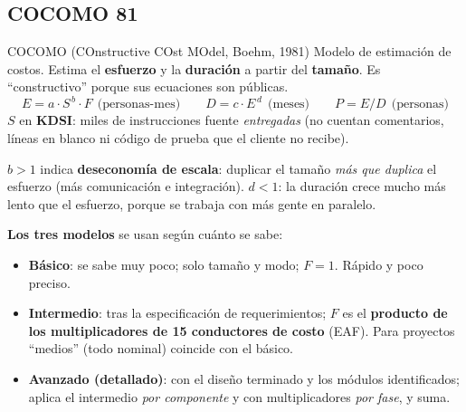 \documentclass[11pt,a4paper]{article}
\begin{document}
\subsection{COCOMO 81}
\label{sec:cocomo}
\begin{defbox}{COCOMO (COnstructive COst MOdel, Boehm, 1981)}
Modelo de estimación de costos. Estima el \textbf{esfuerzo} y la
\textbf{duración} a partir del \textbf{tamaño}. Es ``constructivo'' porque sus ecuaciones son públicas.
\[ E = a \cdot S^{\,b} \cdot F \ \ \text{(personas-mes)} \qquad D = c \cdot E^{\,d} \ \ \text{(meses)} \qquad P = E/D \ \ \text{(personas)} \]
$S$ en \textbf{KDSI}: miles de instrucciones fuente \emph{entregadas} (no cuentan comentarios, líneas en blanco
ni código de prueba que el cliente no recibe).
\end{defbox}
$b > 1$ indica \textbf{deseconomía de escala}: duplicar el tamaño \emph{más que duplica} el esfuerzo (más
comunicación e integración). $d < 1$: la duración crece mucho más lento que el esfuerzo, porque se trabaja con
más gente en paralelo.

\textbf{Los tres modelos} se usan según cuánto se sabe:
\begin{itemize}
  \item \textbf{Básico}: se sabe muy poco; solo tamaño y modo; \textbf{$F = 1$}. Rápido y poco preciso.
  \item \textbf{Intermedio}: tras la especificación de requerimientos; $F$ es el \textbf{producto de los
  multiplicadores de 15 conductores de costo} (EAF). Para proyectos ``medios'' (todo nominal) coincide con el
  básico.
  \item \textbf{Avanzado (detallado)}: con el diseño terminado y los módulos identificados; aplica el intermedio
  \emph{por componente} y con multiplicadores \emph{por fase}, y suma.
\end{itemize}
\end{document}
